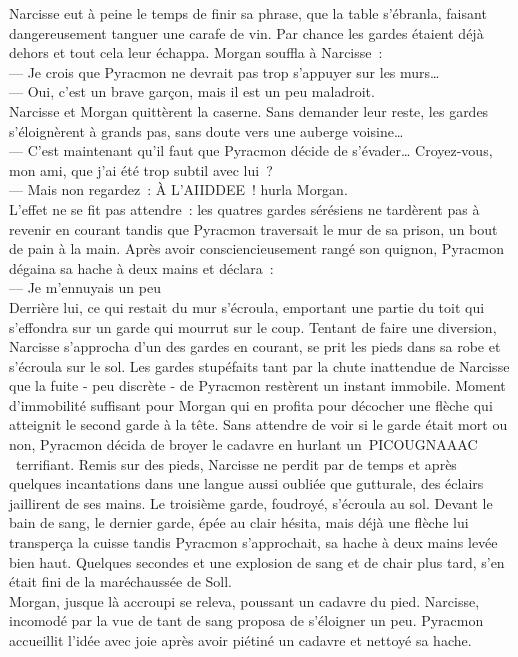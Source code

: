 \documentclass[french, a4paper, 12pt]{article}
\begin{document}
Narcisse eut à peine le temps de finir sa phrase, que la table s'ébranla, faisant dangereusement tanguer une carafe de vin. Par chance les gardes étaient déjà dehors et tout cela leur échappa. Morgan souffla à Narcisse~:\\
--- Je crois que Pyracmon ne devrait pas trop s'appuyer sur les murs…\\
--- Oui, c'est un brave garçon, mais il est un peu maladroit.\\
Narcisse et Morgan quittèrent la caserne. Sans demander leur reste, les gardes s'éloignèrent à grands pas, sans doute vers une auberge voisine…\\
--- C'est maintenant qu'il faut que Pyracmon décide de s'évader… Croyez-vous, mon ami, que j'ai été trop subtil avec lui~?\\
--- Mais non regardez~: À L'AIIDDEE~! hurla Morgan.\\
L'effet ne se fit pas attendre~: les quatres gardes sérésiens ne tardèrent pas à revenir en courant tandis que Pyracmon traversait le mur de sa prison, un bout de pain à la main. Après avoir consciencieusement rangé son quignon, Pyracmon dégaina sa hache à deux mains et déclara~:\\
--- Je m'ennuyais un peu\\
Derrière lui, ce qui restait du mur s'écroula, emportant une partie du toit qui s'effondra sur un garde qui mourrut sur le coup. Tentant de faire une diversion, Narcisse s'approcha d'un des gardes en courant, se prit les pieds dans sa robe et s'écroula sur le sol. Les gardes stupéfaits tant par la chute inattendue de Narcisse que la fuite - peu discrète - de Pyracmon restèrent un instant immobile. Moment d'immobilité suffisant pour Morgan qui en profita pour décocher une flèche qui atteignit le second garde à la tête. Sans attendre de voir si le garde était mort ou non, Pyracmon décida de broyer le cadavre en hurlant un~\og PICOUGNAAAC \fg~terrifiant. Remis sur des pieds, Narcisse ne perdit par de temps et après quelques incantations dans une langue aussi oubliée que gutturale, des éclairs jaillirent de ses mains. Le troisième garde, foudroyé, s'écroula au sol. Devant le bain de sang, le dernier garde, épée au clair hésita, mais déjà une flèche lui transperça la cuisse tandis Pyracmon s'approchait, sa hache à deux mains levée bien haut. Quelques secondes et une explosion de sang et de chair plus tard, s'en était fini de la maréchaussée de Soll.\\

Morgan, jusque là accroupi se releva, poussant un cadavre du pied. Narcisse, incomodé par la vue de tant de sang proposa de s'éloigner un peu. Pyracmon accueillit l'idée avec joie après avoir piétiné un cadavre et nettoyé sa hache.
\end{document}
